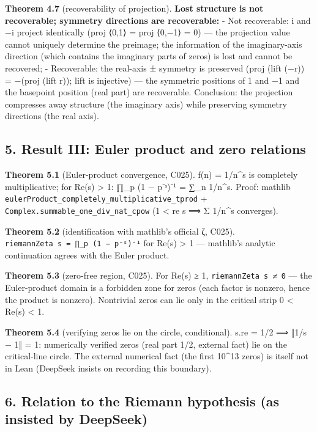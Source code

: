\documentclass[
]{article}
\begin{document}
\textbf{Theorem 4.7} (recoverability of projection). \textbf{Lost
structure is not recoverable; symmetry directions are recoverable:} -
Not recoverable: i and −i project identically (proj ⟨0,1⟩ = proj ⟨0,−1⟩
= 0) --- the projection value cannot uniquely determine the preimage;
the information of the imaginary-axis direction (which contains the
imaginary parts of zeros) is lost and cannot be recovered; -
Recoverable: the real-axis ± symmetry is preserved (proj (lift (−r)) =
−(proj (lift r)); lift is injective) --- the symmetric positions of 1
and −1 and the basepoint position (real part) are recoverable.
Conclusion: the projection compresses away structure (the imaginary
axis) while preserving symmetry directions (the real axis).

\subsection{5. Result III: Euler product and zero
relations}\label{result-iii-euler-product-and-zero-relations}

\textbf{Theorem 5.1} (Euler-product convergence, C025). f(n) = 1/n\^{}s
is completely multiplicative; for Re(s) \textgreater{} 1: ∏\_p (1 −
p⁻ˢ)⁻¹ = ∑\_n 1/n\^{}s. Proof: mathlib
\texttt{eulerProduct\_completely\_multiplicative\_tprod} +
\texttt{Complex.summable\_one\_div\_nat\_cpow} (1 \textless{} re s ⟹ Σ
1/n\^{}s converges).

\textbf{Theorem 5.2} (identification with mathlib's official ζ, C025).
\texttt{riemannZeta\ s\ =\ ∏\_p\ (1\ −\ p⁻ˢ)⁻¹} for Re(s) \textgreater{}
1 --- mathlib's analytic continuation agrees with the Euler product.

\textbf{Theorem 5.3} (zero-free region, C025). For Re(s) ≥ 1,
\texttt{riemannZeta\ s\ ≠\ 0} --- the Euler-product domain is a
forbidden zone for zeros (each factor is nonzero, hence the product is
nonzero). Nontrivial zeros can lie only in the critical strip 0
\textless{} Re(s) \textless{} 1.

\textbf{Theorem 5.4} (verifying zeros lie on the circle, conditional).
s.re = 1/2 ⟹ ‖1/s − 1‖ = 1: numerically verified zeros (real part 1/2,
external fact) lie on the critical-line circle. The external numerical
fact (the first 10\^{}13 zeros) is itself not in Lean (DeepSeek insists
on recording this boundary).

\subsection{6. Relation to the Riemann hypothesis (as insisted by
DeepSeek)}\label{relation-to-the-riemann-hypothesis-as-insisted-by-deepseek}
\end{document}
